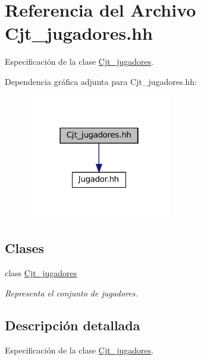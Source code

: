 \hypertarget{_cjt__jugadores_8hh}{}\section{Referencia del Archivo Cjt\+\_\+jugadores.\+hh}
\label{_cjt__jugadores_8hh}


Especificación de la clase \hyperlink{class_cjt__jugadores}{Cjt\+\_\+jugadores}.  


Dependencia gráfica adjunta para Cjt\+\_\+jugadores.\+hh\+:\nopagebreak
\begin{figure}[H]
\begin{center}
\leavevmode
\includegraphics[width=178pt]{_cjt__jugadores_8hh__incl}
\end{center}
\end{figure}
\subsection*{Clases}
\begin{DoxyCompactItemize}
\item 
class \hyperlink{class_cjt__jugadores}{Cjt\+\_\+jugadores}
\begin{DoxyCompactList}\small\item\em Representa el conjunto de jugadores. \end{DoxyCompactList}\end{DoxyCompactItemize}


\subsection{Descripción detallada}
Especificación de la clase \hyperlink{class_cjt__jugadores}{Cjt\+\_\+jugadores}. 

